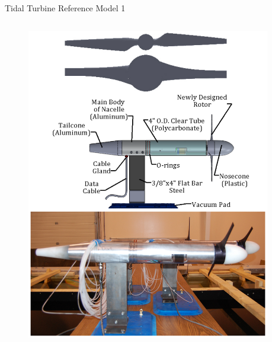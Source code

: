 \documentclass[xcolor=x11names,compress]{beamer}
\renewcommand{\(}{\begin{columns}}
\renewcommand{\)}{\end{columns}}
\newcommand{\<}[1]{\begin{column}{#1}}
\renewcommand{\>}{\end{column}}
\begin{document}
	\begin{frame}{Tidal Turbine Reference Model 1}

		\begin{columns}
		    
		    \begin{column}{0.45\textwidth}

		        \begin{figure}[p]
				    \centering
				    \includegraphics[width=1.1\textwidth]{figures/Nicks_turbines_redesign.png}
				    \label{fig:Nicks turbines}
				\end{figure}

		    \end{column}
		    
		    \begin{column}{0.55\textwidth}
				

\end{column}
\end{columns}
\end{frame}
\end{document}
